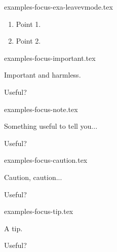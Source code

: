 \begin{filecontents*}[overwrite]{examples-focus-exa-leavevmode.tex}
\begin{tdocexa}
    \leavevmode
    \begin{enumerate}
        \item Point 1.

        \item Point 2.
    \end{enumerate}
\end{tdocexa}
\end{filecontents*}


\begin{filecontents*}[overwrite]{examples-focus-important.tex}
\begin{tdocimp}
    Important and harmless.
\end{tdocimp}

\begin{tdocimp}
    Useful?
\end{tdocimp}
\end{filecontents*}


\begin{filecontents*}[overwrite]{examples-focus-note.tex}
\begin{tdocnote}
    Something useful to tell you...
\end{tdocnote}

\begin{tdocnote}
    Useful?
\end{tdocnote}
\end{filecontents*}


\begin{filecontents*}[overwrite]{examples-focus-caution.tex}
\begin{tdoccaut}
    Caution, caution...
\end{tdoccaut}

\begin{tdoccaut}
    Useful?
\end{tdoccaut}
\end{filecontents*}


\begin{filecontents*}[overwrite]{examples-focus-tip.tex}
\begin{tdoctip}
    A tip.
\end{tdoctip}

\begin{tdoctip}
    Useful?
\end{tdoctip}
\end{filecontents*}


